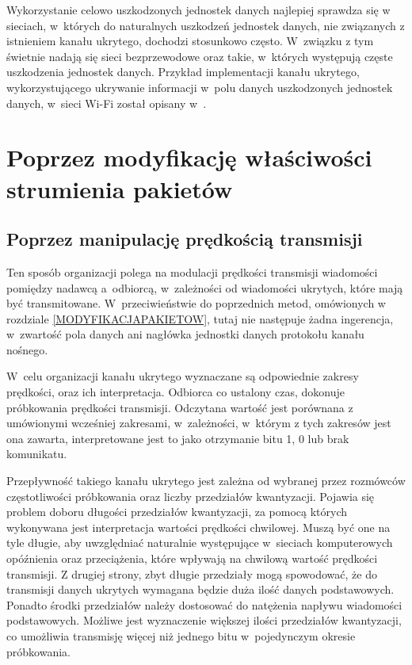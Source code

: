 \documentclass[a4paper, twoside, 12pt]{report}
\begin{document}
        Wykorzystanie celowo uszkodzonych jednostek danych najlepiej sprawdza się w
        sieciach, w~których do naturalnych uszkodzeń jednostek danych, nie związanych z
        istnieniem kanału ukrytego, dochodzi stosunkowo często. W~związku z tym
        świetnie nadają się sieci bezprzewodowe oraz takie, w~których występują
        częste uszkodzenia jednostek danych. Przykład implementacji kanału ukrytego, wykorzystującego
        ukrywanie informacji w~polu danych uszkodzonych jednostek danych, w~sieci Wi-Fi
        został opisany w~\cite{HICCUPS}.

    \section{Poprzez modyfikację właściwości strumienia pakietów} \label{MODYFIKACJASTRUMIENIA}
        \subsection{Poprzez manipulację prędkością transmisji}
        Ten sposób organizacji polega na modulacji prędkości transmisji wiadomości
        pomiędzy nadawcą a~odbiorcą, w~zależności od wiadomości ukrytych, które mają
        być transmitowane. W~przeciwieństwie do poprzednich
        metod, omówionych w rozdziale \ref{MODYFIKACJAPAKIETOW}, tutaj nie następuje
        żadna ingerencja, w~zwartość pola danych ani nagłówka jednostki danych protokołu
        kanału nośnego.

        W~celu organizacji kanału ukrytego wyznaczane są odpowiednie zakresy prędkości, oraz ich
        interpretacja. Odbiorca co ustalony czas, dokonuje próbkowania prędkości
        transmisji. Odczytana wartość jest porównana z umówionymi wcześniej zakresami,
        w~zależności, w~którym z tych zakresów jest ona zawarta, interpretowane jest to
        jako otrzymanie bitu 1, 0 lub brak komunikatu.

        Przepływność takiego kanału ukrytego jest zależna od wybranej przez rozmówców
        częstotliwości próbkowania oraz liczby przedziałów kwantyzacji. Pojawia się
        problem doboru długości przedziałów kwantyzacji, za pomocą których wykonywana
        jest interpretacja wartości
        prędkości chwilowej. Muszą być one na tyle długie, aby uwzględniać naturalnie
        występujące w~sieciach komputerowych opóźnienia oraz przeciążenia, które wpływają
        na chwilową wartość prędkości transmisji. Z drugiej strony, zbyt długie przedziały
        mogą spowodować, że do transmisji danych ukrytych wymagana będzie duża ilość danych
        podstawowych. Ponadto środki przedziałów należy dostosować do natężenia
        napływu wiadomości podstawowych. Możliwe jest wyznaczenie większej ilości
        przedziałów kwantyzacji, co umożliwia transmisję więcej niż jednego bitu w~pojedynczym
        okresie próbkowania.
\end{document}
